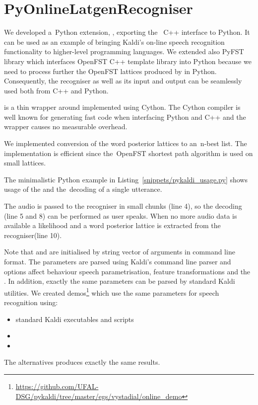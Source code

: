 \section{PyOnlineLatgenRecogniser}
\label{sec:pyext}

We developed a~Python extension, , exporting the~ C++ interface to Python.
It can be used as an example of bringing Kaldi's on-line speech recognition functionality to higher-level programming languages.
We extended also PyFST library\cite{pyfst2014url} which interfaces OpenFST C++ template library into Python because we need to process further the OpenFST lattices produced by  in Python.
Consequently, the recogniser as well as its input and output can be seamlessly used both from C++ and Python.

 is a thin wrapper around  implemented using Cython\cite{cython2014url}.
The Cython compiler is well known for generating fast code when interfacing Python and C++ and the wrapper causes no measurable overhead.

We implemented conversion of the word posterior lattices to an~n-best list.
The implementation is efficient since the~OpenFST shortest path algorithm is used on small lattices.

The minimalistic Python example in Listing~\ref{snippets/pykaldi_usage.py} shows usage of the  and the~decoding of a single utterance.

The audio is passed to the recogniser in small chunks (line 4), so the decoding (line 5 and 8) can be performed as user speaks.
When no more audio data is available a likelihood and a word posterior lattice is extracted from the recogniser(line 10).

Note that  and  are initialised by string vector of arguments in command line format.
The parameters are parsed using Kaldi's command line parser and options affect behaviour speech parametrisation, feature transformations and  the .
In addition, exactly the same parameters can be parsed by standard Kaldi utilities. 
We created demos\footnote{\url{https://github.com/UFAL-DSG/pykaldi/tree/master/egs/vystadial/online_demo}} which use the same parameters for speech recognition using:
\begin{itemize}
    \item standard Kaldi executables and scripts
    \item {} 
    \item {}
\end{itemize}
The alternatives produces exactly the same results.

